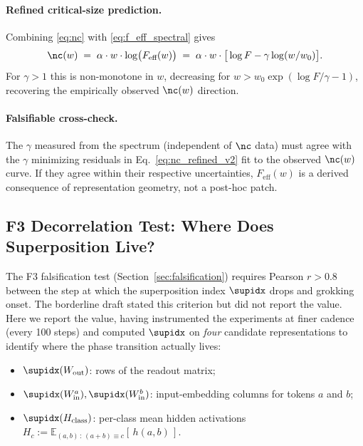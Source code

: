 \paragraph{Refined critical-size prediction.}
Combining \eqref{eq:nc} with \eqref{eq:f_eff_spectral} gives
\begin{equation}
\label{eq:nc_refined_v2}
\nc(w) \;=\; \alpha \cdot w \cdot \log\!\big( F_{\text{eff}}(w) \big) \;=\; \alpha \cdot w \cdot \big[\log F - \gamma \log(w/w_0)\big].
\end{equation}
For $\gamma > 1$ this is non-monotone in $w$, decreasing for $w > w_0 \exp(\log F / \gamma - 1)$, recovering the empirically observed $\nc(w)$ direction.

\paragraph{Falsifiable cross-check.}
The $\gamma$ measured from the spectrum (independent of $\nc$ data) must agree with the $\gamma$ minimizing residuals in Eq.~\eqref{eq:nc_refined_v2} fit to the observed $\nc(w)$ curve. If they agree within their respective uncertainties, $F_{\text{eff}}(w)$ is a derived consequence of representation geometry, not a post-hoc patch.

\subsection{F3 Decorrelation Test: Where Does Superposition Live?}
\label{sec:f3_result}

The F3 falsification test (Section~\ref{sec:falsification}) requires Pearson $r > 0.8$ between the step at which the superposition index $\supidx$ drops and grokking onset.
The borderline draft stated this criterion but did not report the value.
Here we report the value, having instrumented the experiments at finer cadence (every 100 steps) and computed $\supidx$ on \emph{four} candidate representations to identify where the phase transition actually lives:
\begin{itemize}
    \item $\supidx(W_{\text{out}})$: rows of the readout matrix;
    \item $\supidx(W_{\text{in}}^a), \supidx(W_{\text{in}}^b)$: input-embedding columns for tokens $a$ and $b$;
    \item $\supidx(H_{\text{class}})$: per-class mean hidden activations $H_c := \mathbb{E}_{(a,b)\,:\,(a+b)\equiv c}[\,h(a,b)\,]$.
\end{itemize}

